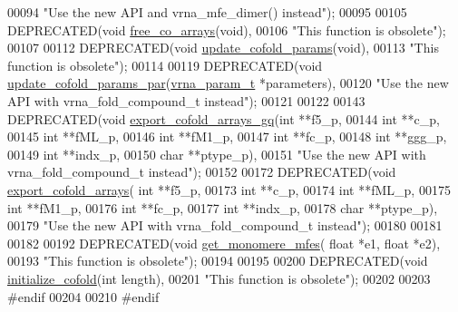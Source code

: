 \begin{DoxyCode}
00094             \textcolor{stringliteral}{"Use the new API and vrna\_mfe\_dimer() instead"});
00095 
00105 DEPRECATED(\textcolor{keywordtype}{void} \hyperlink{group__mfe__cofold_gaafb33d7473eb9af9d1b168ca8761c41a}{free\_co\_arrays}(\textcolor{keywordtype}{void}),
00106           \textcolor{stringliteral}{"This function is obsolete"});
00107 
00112 DEPRECATED(\textcolor{keywordtype}{void} \hyperlink{group__mfe__cofold_ga4fcbf34e77b99bfbb2333d2ab0c41a57}{update\_cofold\_params}(\textcolor{keywordtype}{void}),
00113           \textcolor{stringliteral}{"This function is obsolete"});
00114 
00119 DEPRECATED(\textcolor{keywordtype}{void} \hyperlink{group__mfe__cofold_gaaadbd28b4e428710529ab4098fdacad3}{update\_cofold\_params\_par}(\hyperlink{group__energy__parameters_structvrna__param__s}{vrna\_param\_t} *parameters),
00120           \textcolor{stringliteral}{"Use the new API with vrna\_fold\_compound\_t instead"});
00121 
00122 
00143 DEPRECATED(\textcolor{keywordtype}{void} \hyperlink{group__mfe__cofold_ga5f5bf4df35d0554f6ace9579f8744c48}{export\_cofold\_arrays\_gq}(\textcolor{keywordtype}{int} **f5\_p,
00144                                         \textcolor{keywordtype}{int} **c\_p,
00145                                         \textcolor{keywordtype}{int} **fML\_p,
00146                                         \textcolor{keywordtype}{int} **fM1\_p,
00147                                         \textcolor{keywordtype}{int} **fc\_p,
00148                                         \textcolor{keywordtype}{int} **ggg\_p,
00149                                         \textcolor{keywordtype}{int} **indx\_p,
00150                                         \textcolor{keywordtype}{char} **ptype\_p),
00151           \textcolor{stringliteral}{"Use the new API with vrna\_fold\_compound\_t instead"});
00152 
00172 DEPRECATED(\textcolor{keywordtype}{void} \hyperlink{group__mfe__cofold_ga5cb6b59983f1f74ccc00b9b9c4e84482}{export\_cofold\_arrays}( \textcolor{keywordtype}{int} **f5\_p,
00173                                       \textcolor{keywordtype}{int} **c\_p,
00174                                       \textcolor{keywordtype}{int} **fML\_p,
00175                                       \textcolor{keywordtype}{int} **fM1\_p,
00176                                       \textcolor{keywordtype}{int} **fc\_p,
00177                                       \textcolor{keywordtype}{int} **indx\_p,
00178                                       \textcolor{keywordtype}{char} **ptype\_p),
00179           \textcolor{stringliteral}{"Use the new API with vrna\_fold\_compound\_t instead"});
00180 
00181 
00182 
00192 DEPRECATED(\textcolor{keywordtype}{void} \hyperlink{group__mfe__cofold_ga4958b517c613e4d2afd5bce6c1060a79}{get\_monomere\_mfes}( \textcolor{keywordtype}{float} *e1, \textcolor{keywordtype}{float} *e2),
00193           \textcolor{stringliteral}{"This function is obsolete"});
00194 
00195 
00200 DEPRECATED(\textcolor{keywordtype}{void} \hyperlink{group__mfe__cofold_gafee0c32208aa2ac97338b6e3fbad7fa5}{initialize\_cofold}(\textcolor{keywordtype}{int} length),
00201           \textcolor{stringliteral}{"This function is obsolete"});
00202 
00203 \textcolor{preprocessor}{#endif}
00204 
00210 \textcolor{preprocessor}{#endif}
\end{DoxyCode}
